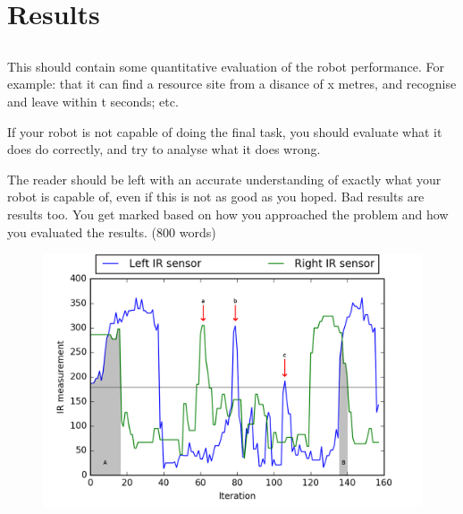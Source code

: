 \section{Results}

\subsection{}

This should contain some quantitative evaluation of the robot performance. For example: that it can find a resource site from a disance of x metres, and recognise and leave within t seconds; etc.

If your robot is not capable of doing the final task, you should evaluate what it does do correctly, and try to analyse what it does wrong.

The reader should be left with an accurate understanding of exactly what your robot is capable of, even if this is not as good as you hoped. Bad results are results too. You get marked based on how you approached the problem and how you evaluated the results. (800 words)


\begin{figure}[ht]
    \centering
    \includegraphics[width=0.7\linewidth]{res/360-scan-plot.png}
    \caption{}
    \label{fig:}
\end{figure}

\newpage
